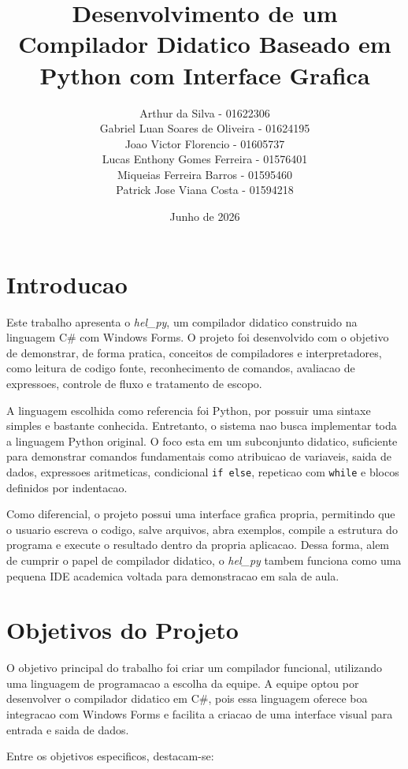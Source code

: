 \documentclass[12pt,a4paper]{article}
\title{Desenvolvimento de um Compilador Didatico Baseado em Python com Interface Grafica}
\author{
Arthur da Silva - 01622306\\
Gabriel Luan Soares de Oliveira - 01624195\\
Joao Victor Florencio - 01605737\\
Lucas Enthony Gomes Ferreira - 01576401\\
Miqueias Ferreira Barros - 01595460\\
Patrick Jose Viana Costa - 01594218
}
\date{Junho de 2026}
\begin{document}
\maketitle

\section{Introducao}

Este trabalho apresenta o \textit{hel\_py}, um compilador didatico construido na linguagem C\# com Windows Forms. O projeto foi desenvolvido com o objetivo de demonstrar, de forma pratica, conceitos de compiladores e interpretadores, como leitura de codigo fonte, reconhecimento de comandos, avaliacao de expressoes, controle de fluxo e tratamento de escopo.

A linguagem escolhida como referencia foi Python, por possuir uma sintaxe simples e bastante conhecida. Entretanto, o sistema nao busca implementar toda a linguagem Python original. O foco esta em um subconjunto didatico, suficiente para demonstrar comandos fundamentais como atribuicao de variaveis, saida de dados, expressoes aritmeticas, condicional \texttt{if else}, repeticao com \texttt{while} e blocos definidos por indentacao.

Como diferencial, o projeto possui uma interface grafica propria, permitindo que o usuario escreva o codigo, salve arquivos, abra exemplos, compile a estrutura do programa e execute o resultado dentro da propria aplicacao. Dessa forma, alem de cumprir o papel de compilador didatico, o \textit{hel\_py} tambem funciona como uma pequena IDE academica voltada para demonstracao em sala de aula.

\section{Objetivos do Projeto}

O objetivo principal do trabalho foi criar um compilador funcional, utilizando uma linguagem de programacao a escolha da equipe. A equipe optou por desenvolver o compilador didatico em C\#, pois essa linguagem oferece boa integracao com Windows Forms e facilita a criacao de uma interface visual para entrada e saida de dados.

Entre os objetivos especificos, destacam-se:
\end{document}
